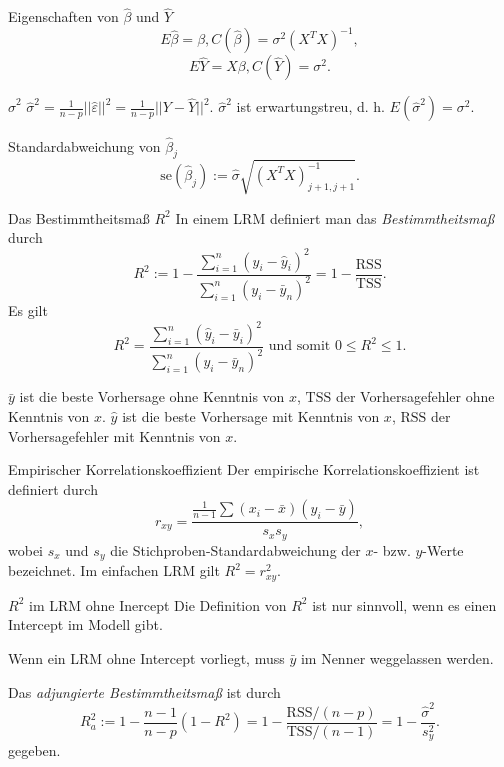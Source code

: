 \begin{karte}{Eigenschaften von \(\hat{\beta}\) und \(\hat{Y}\)}
\[E\hat{\beta} = \beta, C(\hat{\beta}) = \sigma^2 (X^T X)^{-1}, \]
\[ E \hat{Y} = X \beta, C(\hat{Y}) = \sigma^2. \]
\end{karte}

\begin{karte}{\(\hat{\sigma}^2\)}
\(\hat{\sigma}^2 = \frac{1}{n-p} ||\hat{\varepsilon}||^2 = \frac{1}{n-p} ||Y-\hat{Y}||^2\).
\(\hat{\sigma}^2\) ist erwartungstreu, d. h. \(E(\hat{\sigma}^2) = \sigma^2\).
\end{karte}

\begin{karte}{Standardabweichung von \(\hat{\beta}_j\)}
\[ \mathrm{se}(\hat{\beta}_j) := \hat{\sigma} \sqrt{ (X^T X)^{-1}_{j+1,j+1} }. \]
\end{karte}

\begin{karte}{Das Bestimmtheitsmaß \(R^2\)}
In einem LRM definiert man das \textit{Bestimmtheitsmaß} durch 
\[ R^2 := 1 - \frac{ \sum_{i=1}^n (y_i - \hat{y}_i)^2 }{ \sum_{i=1}^n (y_i - \bar{y}_n)^2 } = 1 - \frac{\mathrm{RSS}}{\mathrm{TSS}}. \]
Es gilt 
\[ R^2 = \frac{ \sum_{i=1}^n (\hat{y}_i - \bar{y}_i)^2 }{ \sum_{i=1}^n (y_i - \bar{y}_n)^2 } \text{ und somit } 0 \leq R^2 \leq 1. \]

\(\bar{y}\) ist die beste Vorhersage ohne Kenntnis von \(x\), \(\mathrm{TSS}\) der Vorhersagefehler ohne Kenntnis von \(x\). 
\(\hat{y}\) ist die beste Vorhersage mit Kenntnis von \(x\), \(\mathrm{RSS}\) der Vorhersagefehler mit Kenntnis von \(x\). 
\end{karte}

\begin{karte}{Empirischer Korrelationskoeffizient}
Der empirische Korrelationskoeffizient ist definiert durch 
\[ r_{xy} = \frac{\frac{1}{n-1} \sum (x_i - \bar{x})(y_i - \bar{y})}{s_x s_y}, \]
wobei \(s_x\) und \(s_y\) die Stichproben-Standardabweichung der \(x\)- bzw. \(y\)-Werte bezeichnet. 
Im einfachen LRM gilt \(R^2 = r_{xy}^2\).
\end{karte}

\begin{karte}{\(R^2\) im LRM ohne Inercept}
Die Definition von \(R^2\) ist nur sinnvoll, wenn es einen Intercept im Modell gibt. 

Wenn ein LRM ohne Intercept vorliegt, muss \(\bar{y}\) im Nenner weggelassen werden.

Das \textit{adjungierte Bestimmtheitsmaß} ist durch 
\[ R_a^2 := 1 - \frac{n-1}{n-p} (1-R^2) = 1 - \frac{\mathrm{RSS}/(n-p)}{\mathrm{TSS}/(n-1)} = 1 - \frac{\hat{\sigma}^2}{s_y^2}. \]
gegeben.
\end{karte}

